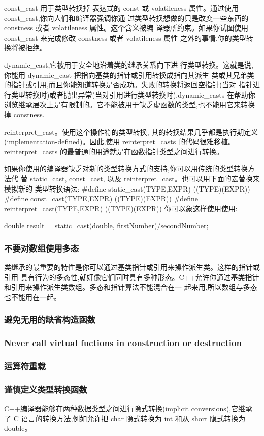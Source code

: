 const_cast 用于类型转换掉 表达式的 const 或 volatileness 属性。通过使用 const_cast,你向人们和编译器强调你通 过类型转换想做的只是改变一些东西的 constness 或者 volatileness 属性。这个含义被编 译器所约束。如果你试图使用 const_cast 来完成修改 constness 或者 volatileness 属性 之外的事情,你的类型转换将被拒绝。

dynamic_cast,它被用于安全地沿着类的继承关系向下进 行类型转换。这就是说,你能用 dynamic_cast 把指向基类的指针或引用转换成指向其派生 类或其兄弟类的指针或引用,而且你能知道转换是否成功。失败的转换将返回空指针(当对 指针进行类型转换时)或者抛出异常(当对引用进行类型转换时).dynamic_casts 在帮助你浏览继承层次上是有限制的。它不能被用于缺乏虚函数的类型,也不能用它来转换掉 constness.

reinterpret_cast。使用这个操作符的类型转换, 其的转换结果几乎都是执行期定义(implementation-defined)。因此,使用 reinterpret_casts 的代码很难移植。
reinterpret_casts 的最普通的用途就是在函数指针类型之间进行转换。

如果你使用的编译器缺乏对新的类型转换方式的支持,你可以用传统的类型转换方法代 替 static_cast, const_cast, 以及 reinterpret_cast。也可以用下面的宏替换来模拟新的 类型转换语法:
#define static_cast(TYPE,EXPR) ((TYPE)(EXPR)) #define const_cast(TYPE,EXPR) ((TYPE)(EXPR)) #define reinterpret_cast(TYPE,EXPR) ((TYPE)(EXPR)) 你可以象这样使用使用:

double result = static_cast(double, firstNumber)/secondNumber;

\subsubsection{不要对数组使用多态}
类继承的最重要的特性是你可以通过基类指针或引用来操作派生类。这样的指针或引用 具有行为的多态性,就好像它们同时具有多种形态。C++允许你通过基类指针和引用来操作派生类数组。多态和指针算法不能混合在一 起来用,所以数组与多态也不能用在一起。

\subsubsection{避免无用的缺省构造函数}
\subsubsection{Never call virtual fuctions in construction or destruction}
\subsubsection{运算符重载}
\subsubsection{谨慎定义类型转换函数}
C++编译器能够在两种数据类型之间进行隐式转换(implicit conversions),它继承 了 C 语言的转换方法,例如允许把 char 隐式转换为 int 和从 short 隐式转换为 double。

